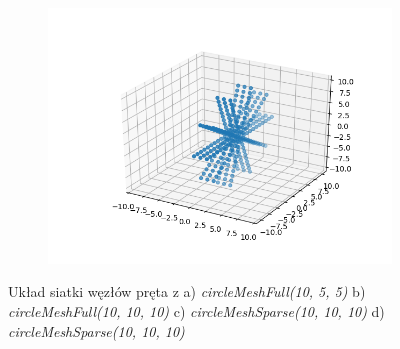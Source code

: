 \begin{figure}
\begin{subfigure}{.5\textwidth}
  \caption{}
  \label{fig:sfig3}
\end{subfigure}%
\begin{subfigure}{.5\textwidth}
  \centering
  \includegraphics[width=.8\linewidth]{Zdjecia/5/pret4}
  \caption{}
  \label{fig:sfig4}
\end{subfigure} 
\caption{Układ siatki węzłów pręta z a) \textit{circleMeshFull(10, 5, 5)} b) \textit{circleMeshFull(10, 10, 10)} c) \textit{circleMeshSparse(10, 10, 10)} d) \textit{circleMeshSparse(10, 10, 10)}}
\label{fig:pret}
\end{figure}

